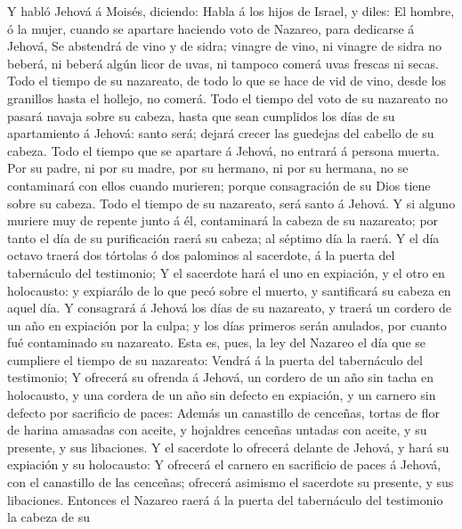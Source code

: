  Y habló Jehová á Moisés, diciendo:  Habla á
los hijos de Israel, y diles: El hombre, ó la mujer, cuando se apartare
haciendo voto de Nazareo, para dedicarse á Jehová,  Se
abstendrá de vino y de sidra; vinagre de vino, ni vinagre de sidra no
beberá, ni beberá algún licor de uvas, ni tampoco comerá uvas frescas ni
secas.  Todo el tiempo de su nazareato, de todo lo que se
hace de vid de vino, desde los granillos hasta el hollejo, no comerá.
 Todo el tiempo del voto de su nazareato no pasará navaja
sobre su cabeza, hasta que sean cumplidos los días de su apartamiento á
Jehová: santo será; dejará crecer las guedejas del cabello de su cabeza.
 Todo el tiempo que se apartare á Jehová, no entrará á
persona muerta.  Por su padre, ni por su madre, por su
hermano, ni por su hermana, no se contaminará con ellos cuando murieren;
porque consagración de su Dios tiene sobre su cabeza. 
Todo el tiempo de su nazareato, será santo á Jehová.  Y si
alguno muriere muy de repente junto á él, contaminará la cabeza de su
nazareato; por tanto el día de su purificación raerá su cabeza; al
séptimo día la raerá.  Y el día octavo traerá dos
tórtolas ó dos palominos al sacerdote, á la puerta del tabernáculo del
testimonio;  Y el sacerdote hará el uno en expiación, y
el otro en holocausto: y expiarálo de lo que pecó sobre el muerto, y
santificará su cabeza en aquel día.  Y consagrará á
Jehová los días de su nazareato, y traerá un cordero de un año en
expiación por la culpa; y los días primeros serán anulados, por cuanto
fué contaminado su nazareato.  Esta es, pues, la ley del
Nazareo el día que se cumpliere el tiempo de su nazareato: Vendrá á la
puerta del tabernáculo del testimonio;  Y ofrecerá su
ofrenda á Jehová, un cordero de un año sin tacha en holocausto, y una
cordera de un año sin defecto en expiación, y un carnero sin defecto por
sacrificio de paces:  Además un canastillo de cenceñas,
tortas de flor de harina amasadas con aceite, y hojaldres cenceñas
untadas con aceite, y su presente, y sus libaciones.  Y
el sacerdote lo ofrecerá delante de Jehová, y hará su expiación y su
holocausto:  Y ofrecerá el carnero en sacrificio de paces
á Jehová, con el canastillo de las cenceñas; ofrecerá asimismo el
sacerdote su presente, y sus libaciones.  Entonces el
Nazareo raerá á la puerta del tabernáculo del testimonio la cabeza de su
